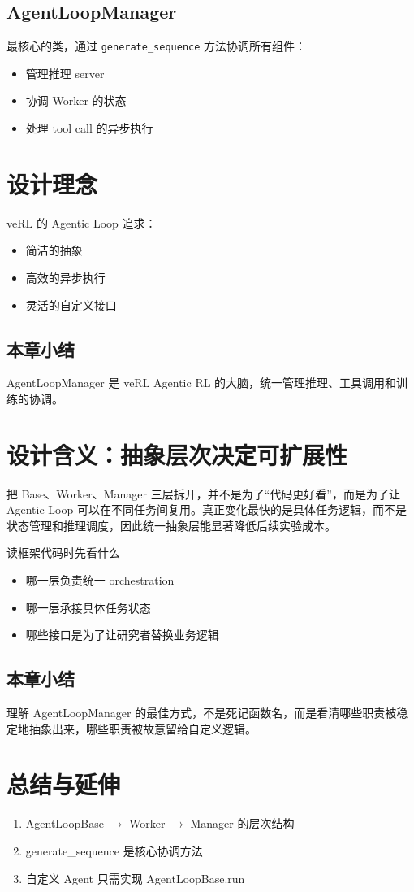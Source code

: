 \documentclass[a4paper]{article}
\begin{document}
\subsection{AgentLoopManager}
最核心的类，通过 \texttt{generate\_sequence} 方法协调所有组件：
\begin{itemize}
  \item 管理推理 server
  \item 协调 Worker 的状态
  \item 处理 tool call 的异步执行
\end{itemize}

\section{设计理念}
veRL 的 Agentic Loop 追求：
\begin{itemize}
  \item 简洁的抽象
  \item 高效的异步执行
  \item 灵活的自定义接口
\end{itemize}

\subsection{本章小结}
AgentLoopManager 是 veRL Agentic RL 的大脑，统一管理推理、工具调用和训练的协调。

\newpage
\section{设计含义：抽象层次决定可扩展性}
把 Base、Worker、Manager 三层拆开，并不是为了“代码更好看”，而是为了让 Agentic Loop 可以在不同任务间复用。真正变化最快的是具体任务逻辑，而不是状态管理和推理调度，因此统一抽象层能显著降低后续实验成本。

\begin{knowledgebox}{读框架代码时先看什么}
\begin{itemize}
  \item 哪一层负责统一 orchestration
  \item 哪一层承接具体任务状态
  \item 哪些接口是为了让研究者替换业务逻辑
\end{itemize}
\end{knowledgebox}

\subsection{本章小结}
理解 AgentLoopManager 的最佳方式，不是死记函数名，而是看清哪些职责被稳定地抽象出来，哪些职责被故意留给自定义逻辑。

\newpage
\section{总结与延伸}
\begin{enumerate}
  \item AgentLoopBase $\to$ Worker $\to$ Manager 的层次结构
  \item generate\_sequence 是核心协调方法
  \item 自定义 Agent 只需实现 AgentLoopBase.run
\end{enumerate}
\end{document}
